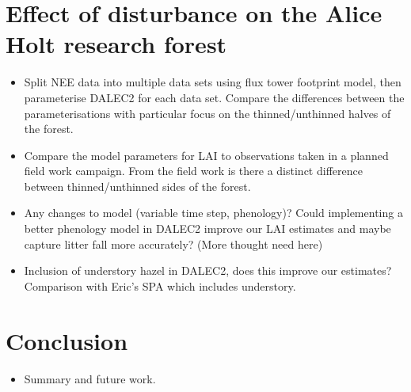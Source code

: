 \documentclass[11pt]{article}
\begin{document}
\section{Effect of disturbance on the Alice Holt research forest}
\begin{itemize}
\item Split NEE data into multiple data sets using flux tower footprint model, then parameterise DALEC2 for each data set. Compare the differences between the parameterisations with particular focus on the thinned/unthinned halves of the forest.
\item Compare the model parameters for LAI to observations taken in a planned field work campaign. From the field work is there a distinct difference between thinned/unthinned sides of the forest.
\item Any changes to model (variable time step, phenology)? Could implementing a better phenology model in DALEC2 improve our LAI estimates and maybe capture litter fall more accurately? (More thought need here)
\item Inclusion of understory hazel in DALEC2, does this improve our estimates? Comparison with Eric's SPA which includes understory.
\end{itemize}


\section{Conclusion}
\begin{itemize}
\item Summary and future work.
\end{itemize}
\end{document}
